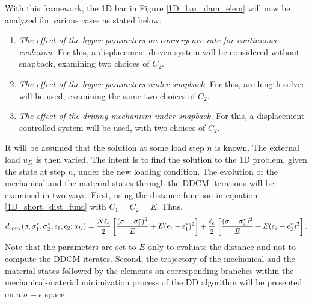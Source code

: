 \documentclass[10pt]{cas-sc}
\newcommand{\added}[1]{#1}
\newenvironment{addedblock}{}{}
\begin{document}

With this framework, the 1D bar in Figure \ref{1D_bar_dam_elem} will now be analyzed for various cases as stated below. 
\begin{addedblock}
\begin{enumerate}
	\item\label{case:rate} \emph{The effect of the hyper-parameters on convergence rate for continuous evolution.} For this, a displacement-driven system will be considered without snapback, examining two choices of $C_2$.
	\item\label{case:necessity_metric} \emph{The effect of the hyper-parameters under snapback.} For this, arc-length solver will be used, examining the same two choices of $C_2$.
	\item\label{case:necessity_solver} \emph{The effect of the driving mechanism under snapback.} For this, a displacement controlled system will be used, with two choices of $C_2$.
\end{enumerate}
\end{addedblock}


It will be assumed that the solution at some load step $n$ is known. The external load $u_D$ is then varied. The intent is to find the solution to the 1D problem, given the state at step $n$, under the new loading condition. \added{The evolution of the mechanical and the material states through the DDCM iterations will be examined in two ways. First, using the distance function in equation \ref{1D_short_dist_func} with $C_1=C_2=E$. Thus, }
\begin{equation}
	d_{\rm conv}(\sigma,\sigma_1^*,\sigma_2^*,\epsilon_1,\epsilon_2;u_D) = \frac{N \ell_e}{2} \left[ \frac{(\sigma - \sigma_1^*)^2}{E} +  E(\epsilon_1 - \epsilon_1^*)^2 \right] + \frac{\ell_e}{2}  \left[ \frac{(\sigma - \sigma_2^*)^2}{E} +  E(\epsilon_2 - \epsilon_2^*)^2 \right]. \label{1D_short_dist_func_conv}
\end{equation}
\added{Note that the parameters are set to $E$ only to evaluate the distance and not to compute the DDCM iterates. Second, the trajectory of the mechanical and the material states followed by the elements on corresponding branches within the mechanical-material minimization process of the DD algorithm will be presented on a $\sigma-\epsilon$ space.} 
	
\end{document}
